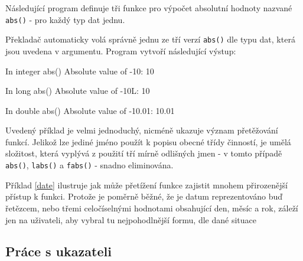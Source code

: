 {      \begin{example}
        Následující program definuje tři funkce pro výpočet absolutní hodnoty nazvané 
        \lstinline[basicstyle=\ttfamily]!abs()! - pro každý typ dat jednu.
        
        \end{example}
  
        Překladač automaticky volá správně jednu ze tří verzí 
        \lstinline[basicstyle=\ttfamily]!abs()! dle typu dat, která jsou uvedena v argumentu. 
        Program vytvoří následující výstup:
        \begin{center}
          In integer abs()
          Absolute value of -10: 10
    
          In long abs()
          Absolute value of -10L: 10
    
          In double abs()
          Absolute value of -10.01: 10.01
        \end{center}
  
        Uvedený příklad je velmi jednoduchý, nicméně ukazuje význam přetěžování funkcí. Jelikož lze 
        jediné jméno použít k popisu obecné třídy činností, je umělá složitost, která vyplývá z 
        použití tří mírně odlišných jmen - v tomto případě \lstinline[basicstyle=\ttfamily]!abs()!, 
        \lstinline[basicstyle=\ttfamily]!labs()! a \lstinline[basicstyle=\ttfamily]!fabs()! - 
        snadno eliminována.
  
        \begin{example}\label{date}
        
        \end{example}
  
      Příklad \ref{date} ilustruje jak může přetížení funkce zajistit mnohem při\-rozenější přístup 
      k funkci. Protože je poměrně běžné, že je datum reprezentováno buď řetězcem, nebo třemi 
      celočíselnými hodnotami obsahující den, měsíc a rok, záleží jen na uživateli, aby vybral tu 
      nejpohodlnější formu, dle dané situace
  
    \subsection{Práce s ukazateli}  
  
}
